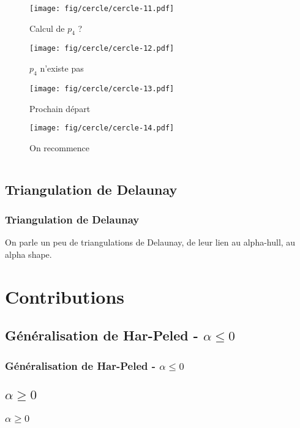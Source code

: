 \documentclass{beamer}
\begin{document}
\begin{frame}
\begin{columns}[t]
\begin{column}{6cm}
{
  \begin{figure}[h!]
    \centering
    \texttt{[image: fig/cercle/cercle-11.pdf]}
    \caption{Calcul de $p_{4}$ ?}
\end{figure}
}
{
  \begin{figure}[h!]
    \centering
    \texttt{[image: fig/cercle/cercle-12.pdf]}
    \caption{$p_{4}$ n'existe pas}
\end{figure}
}
{
  \begin{figure}[h!]
    \centering
    \texttt{[image: fig/cercle/cercle-13.pdf]}
    \caption{Prochain départ}
\end{figure}
}
{
  \begin{figure}[h!]
    \centering
    \texttt{[image: fig/cercle/cercle-14.pdf]}
    \caption{On recommence}
\end{figure}
}



  \end{column}
\end{columns} 

\end{frame}
    
\subsection{Triangulation de Delaunay}  %
\begin{frame}
\frametitle{Triangulation de Delaunay}
On parle un peu de triangulations de Delaunay, de leur lien au alpha-hull, au alpha shape.

\end{frame}

\section{Contributions}

\subsection{Généralisation de Har-Peled - $\alpha \leq 0$}
\begin{frame}
\frametitle{Généralisation de Har-Peled - $\alpha \leq 0$}

\end{frame}

\subsection{$\alpha \geq 0$}
\begin{frame}
\frametitle{$\alpha \geq 0$}
\end{frame}
\end{document}
